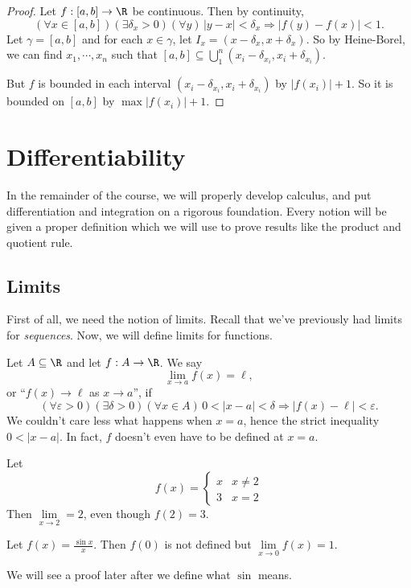 \documentclass[a4paper]{article}
\begin{document}
\begin{proof}
  Let $f: [a, b]\to \R$ be continuous. Then by continuity,
  \[
    (\forall x\in [a, b])(\exists \delta_x > 0)(\forall y)\, |y - x| < \delta_x\Rightarrow |f(y) - f(x)| < 1.
  \]
  Let $\gamma = [a, b]$ and for each $x\in \gamma$, let $I_x = (x - \delta_x, x + \delta_x)$. So by Heine-Borel, we can find $x_1, \cdots, x_n$ such that $[a, b]\subseteq \bigcup_1^n (x_i - \delta_{x_i}, x_i + \delta_{x_i})$.

  But $f$ is bounded in each interval $(x_i - \delta_{x_i}, x_i + \delta_{x_i})$ by $|f(x_i)| + 1$. So it is bounded on $[a, b]$ by $\max|f(x_i)| + 1$.
\end{proof}

\section{Differentiability}
In the remainder of the course, we will properly develop calculus, and put differentiation and integration on a rigorous foundation. Every notion will be given a proper definition which we will use to prove results like the product and quotient rule.
\subsection{Limits}
First of all, we need the notion of limits. Recall that we've previously had limits for \emph{sequences}. Now, we will define limits for functions.
\begin{defi}
  Let $A\subseteq \R$ and let $f: A\to \R$. We say
  \[
    \lim_{x\to a}f(x) = \ell,
  \]
  or ``$f(x) \to \ell$ as $x \to a$'', if
  \[
    (\forall \varepsilon > 0)(\exists \delta > 0)(\forall x\in A)\, 0 < |x - a| < \delta \Rightarrow |f(x) - \ell| < \varepsilon.
  \]
  We couldn't care less what happens when $x = a$, hence the strict inequality $0 < |x - a|$. In fact, $f$ doesn't even have to be defined at $x = a$.
\end{defi}

\begin{eg}
  Let
  \[
    f(x) =
    \begin{cases}
      x & x \not = 2\\
      3 & x = 2
    \end{cases}
  \]
  Then $\lim\limits_{x\to 2} = 2$, even though $f(2) = 3$.
\end{eg}

\begin{eg}
  Let $f(x) = \frac{\sin x}{x}$. Then $f(0)$ is not defined but $\lim\limits_{x\to 0}f(x) = 1$.

  We will see a proof later after we define what $\sin$ means.
\end{eg}
\end{document}
